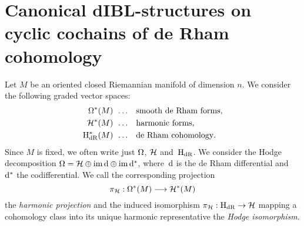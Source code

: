 \documentclass[\MainFolder/Text.tex]{subfiles}
\begin{document}
	

\section{Canonical dIBL-structures on cyclic cochains of de Rham cohomology} \label{Sec:Manifold1}
Let $M$ be an oriented closed Riemannian manifold of dimension $n$. We consider the following graded vector spaces:
$$\begin{aligned}
\Omega^*(M) &\;\,\dots && \text{smooth de Rham forms}, \\
\mathcal{H}^*(M) &\;\,\dots &&\text{harmonic forms}, \\
\mathrm{H}_{\mathrm{dR}}^*(M) &\;\,\dots && \text{de Rham cohomology}.
\end{aligned}$$
Since $M$ is fixed, we often write just $\Omega$, $\mathcal{H}$ and~$\mathrm{H}_{\mathrm{dR}}$. We consider the Hodge decomposition $\Omega=\mathcal{H}\oplus\operatorname{im}\mathrm{d}\oplus\operatorname{im}\mathrm{d}^*$, where~$\mathrm{d}$ is the de Rham differential and~$\mathrm{d}^*$ the codifferential. We call the corresponding projection
\begin{equation}\label{Eq:HarmProj}
\pi_{\mathcal{H}}: \Omega^*(M) \longrightarrow \mathcal{H}^*(M) 
\end{equation}
the \emph{harmonic projection} and the induced isomorphism $\pi_{\mathcal{H}}: \mathrm{H}_{\mathrm{dR}} \rightarrow \mathcal{H}$ mapping a cohomology class into its unique harmonic representative the \emph{Hodge isomorphism}.
\end{document}
